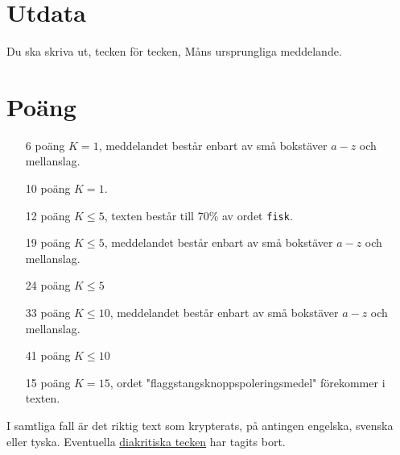 \section*{Utdata}
Du ska skriva ut, tecken för tecken, Måns ursprungliga meddelande.

\section*{Poäng}

\begin{enumerate}
	\item[6 poäng] $K = 1$, meddelandet består enbart av små bokstäver $a-z$ och mellanslag.
	\item[10 poäng] $K = 1$.
  \item[12 poäng] $K \le 5$, texten består till 70\% av ordet \texttt{fisk}.
	\item[19 poäng] $K \le 5$, meddelandet består enbart av små bokstäver $a-z$ och mellanslag.
  \item[24 poäng] $K \le 5$
	\item[33 poäng] $K \le 10$, meddelandet består enbart av små bokstäver $a-z$ och mellanslag.
  \item[41 poäng] $K \le 10$
	\item[15 poäng] $K = 15$, ordet "flaggstangsknoppspoleringsmedel" förekommer i texten.
\end{enumerate}

I samtliga fall är det riktig text som krypterats, på antingen engelska, svenska eller tyska. Eventuella \href{https://sv.wikipedia.org/wiki/Diakritiskt\_tecken}{diakritiska tecken} har tagits bort.
